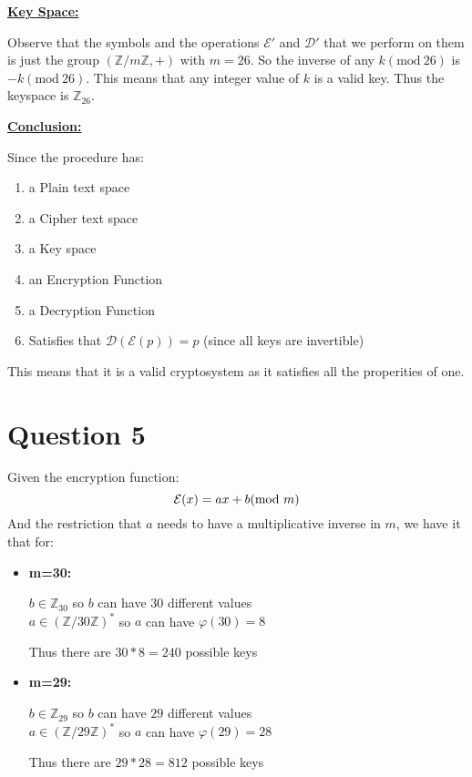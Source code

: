\documentclass{article}
\numberwithin{equation}{subsection}
\begin{document}
	\newpage
	\underline{\textbf{Key Space:}}


	Observe that the symbols and the operations $\mathcal{E}'$ and $\mathcal{D}'$ that we 
	perform on them is just the group $(\mathbb{Z}/m\mathbb{Z}, +)$ with $m=26$. So the inverse of
	any $k (\textrm{mod}\ 26)$ is $-k (\textrm{mod}\ 26)$. This means that any integer value of $k$ is a 
	valid key. Thus the keyspace is $\mathbb{Z}_{26}$.

	\vspace{20pt}
	\underline{\textbf{Conclusion:}}

	Since the procedure has:
	\begin{enumerate}
		\item a Plain text space
		\item a Cipher text space
		\item a Key space
		\item an Encryption Function
		\item a Decryption Function
		\item Satisfies that $\mathcal{D}(\mathcal{E}(p))=p$ (since all keys are invertible)
	\end{enumerate}

	This means that it is a valid cryptosystem as it satisfies all the properities of one.

	\vspace{30pt}
	\section*{Question 5}
	Given the encryption function:
	\begin{equation}\notag
		\mathcal{E}(x) = ax +b (\textrm{mod}\ m) 
	\end{equation}
	And the restriction that $a$ needs to have a multiplicative inverse in $m$, we have it that for:
	\begin{itemize}
		\item \textbf{m=30:}

			$b \in \mathbb{Z}_{30}$ so $b$ can have $30$ different values\\
			$a \in (\mathbb{Z}/30\mathbb{Z})^*$ so $a$ can have $\varphi(30)=8$
			

			Thus there are $30*8=240$ possible keys 
		
		\item \textbf{m=29:}

			$b \in \mathbb{Z}_{29}$ so $b$ can have $29$ different values\\
			$a \in (\mathbb{Z}/29\mathbb{Z})^*$ so $a$ can have $\varphi(29)=28$
			

			Thus there are $29*28 = 812$ possible keys 
			
	\end{itemize}
	
\end{document}
